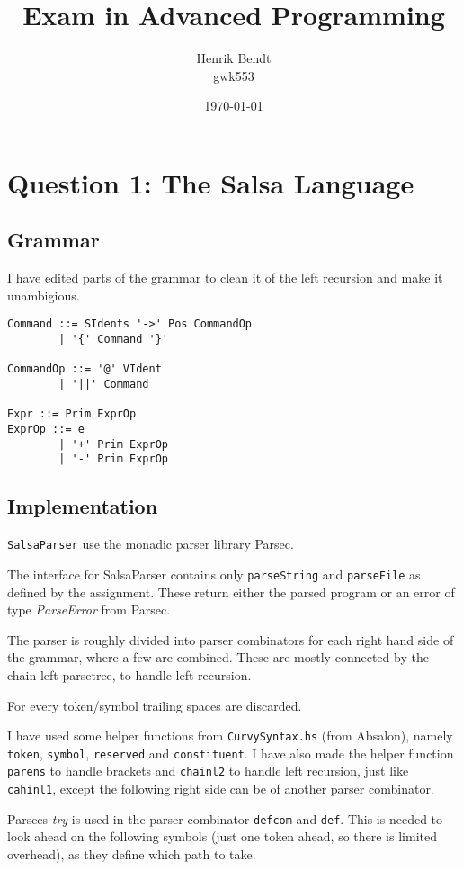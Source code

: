 \documentclass[a4paper, 10pt]{article}
\author{Henrik Bendt\\ gwk553}
\title{Exam in Advanced Programming}
\date{\today}
\begin{document}
\maketitle
\pagebreak

\section{Question 1: The Salsa Language}

\subsection{Grammar}
I have edited parts of the grammar to clean it of the left recursion and make it unambigious.

\begin{verbatim}
Command ::= SIdents '->' Pos CommandOp
        | '{' Command '}'

CommandOp ::= '@' VIdent
        | '||' Command

Expr ::= Prim ExprOp
ExprOp ::= e
        | '+' Prim ExprOp
        | '-' Prim ExprOp

\end{verbatim}

\subsection{Implementation}
\texttt{SalsaParser} use the monadic parser library Parsec. 

The interface for SalsaParser contains only \texttt{parseString} and \texttt{parseFile} as defined by the assignment. These return either the parsed program or an error of type \textit{ParseError} from Parsec.

The parser is roughly divided into parser combinators for each right hand side of the grammar, where a few are combined.
These are mostly connected by the chain left parsetree, to handle left recursion.

For every token/symbol trailing spaces are discarded.

I have used some helper functions from \texttt{CurvySyntax.hs} (from Absalon), namely \texttt{token}, \texttt{symbol}, \texttt{reserved} and \texttt{constituent}. I have also made the helper function \texttt{parens} to handle brackets and \texttt{chainl2} to handle left recursion, just like \texttt{cahinl1}, except the following right side can be of another parser combinator.

Parsecs \textit{try} is used in the parser combinator \texttt{defcom} and \texttt{def}. This is needed to look ahead on the following symbols (just one token ahead, so there is limited overhead), as they define which path to take. %
\end{document}
